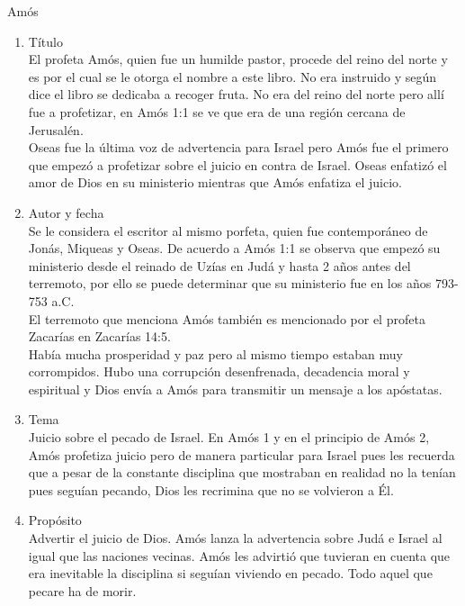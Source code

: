 %
%
\begin{section}{Amós}
	\begin{enumerate}
		\item Título\\
			El profeta Amós, quien fue un humilde pastor, procede del reino del norte y es por el cual se le otorga el nombre a este libro. No era instruido y según dice el libro se dedicaba a recoger fruta. No era del reino del norte pero allí fue a profetizar, en Amós 1:1 se ve que era de una región cercana de Jerusalén.\\
			Oseas fue la última voz de advertencia para Israel pero Amós fue el primero que empezó a profetizar sobre el juicio en contra de Israel. Oseas enfatizó el amor de Dios en su ministerio mientras que Amós enfatiza el juicio.
		\item Autor y fecha\\
			Se le considera el escritor al mismo porfeta,  quien fue contemporáneo de Jonás, Miqueas y Oseas. De acuerdo a Amós 1:1 se observa que empezó su ministerio desde el reinado de Uzías en Judá y hasta 2 años antes del terremoto, por ello se puede determinar que su ministerio fue en los años 793-753 a.C.\\
			El terremoto que menciona Amós también es mencionado por el profeta Zacarías en Zacarías 14:5.\\
			Había mucha prosperidad y paz pero al mismo tiempo estaban muy corrompidos. Hubo una corrupción desenfrenada, decadencia moral y espiritual y Dios envía a Amós para transmitir un mensaje a los apóstatas.
		\item Tema\\
			Juicio sobre el pecado de Israel. En Amós 1 y en el principio de Amós 2, Amós profetiza juicio pero de manera particular para Israel pues les recuerda que a pesar de la constante disciplina que mostraban en realidad no la tenían pues seguían pecando, Dios les recrimina que no se volvieron a Él.
		\item Propósito\\
			Advertir el juicio de Dios. Amós lanza la advertencia sobre Judá e Israel al igual que las naciones vecinas. Amós les advirtió que tuvieran en cuenta que era inevitable la disciplina si seguían viviendo en pecado. Todo aquel que pecare ha de morir.
	\end{enumerate}

\end{section}
